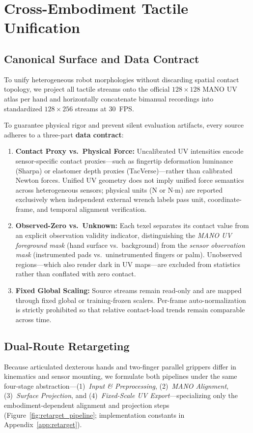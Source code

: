 \section{Cross-Embodiment Tactile Unification}
\label{sec:retarget_data}

\subsection{Canonical Surface and Data Contract}
\label{sec:data_contract}
To unify heterogeneous robot morphologies without discarding spatial contact topology, we project all tactile streams onto the official $128\times 128$ MANO UV atlas \citep{romero2017embodied} per hand and horizontally concatenate bimanual recordings into standardized $128\times 256$ streams at 30~FPS.

To guarantee physical rigor and prevent silent evaluation artifacts, every source adheres to a three-part \textbf{data contract}:
\begin{enumerate}[leftmargin=*,nosep]
    \item \textbf{Contact Proxy vs.\ Physical Force:} Uncalibrated UV intensities encode sensor-specific contact proxies---such as fingertip deformation luminance (Sharpa) or elastomer depth proxies (TacVerse)---rather than calibrated Newton forces. Unified UV geometry does not imply unified force semantics across heterogeneous sensors; physical units (N or N$\cdot$m) are reported exclusively when independent external wrench labels pass unit, coordinate-frame, and temporal alignment verification.
    \item \textbf{Observed-Zero vs.\ Unknown:} Each texel separates its contact value from an explicit observation validity indicator, distinguishing the \emph{MANO UV foreground mask} (hand surface vs.\ background) from the \emph{sensor observation mask} (instrumented pads vs.\ uninstrumented fingers or palm). Unobserved regions---which also render dark in UV maps---are excluded from statistics rather than conflated with zero contact.
    \item \textbf{Fixed Global Scaling:} Source streams remain read-only and are mapped through fixed global or training-frozen scalers. Per-frame auto-normalization is strictly prohibited so that relative contact-load trends remain comparable across time.
\end{enumerate}

\subsection{Dual-Route Retargeting}
\label{sec:retarget_pipelines}
Because articulated dexterous hands and two-finger parallel grippers differ in kinematics and sensor mounting, we formulate both pipelines under the same four-stage abstraction---(1)~\emph{Input \& Preprocessing}, (2)~\emph{MANO Alignment}, (3)~\emph{Surface Projection}, and (4)~\emph{Fixed-Scale UV Export}---specializing only the embodiment-dependent alignment and projection steps (Figure~\ref{fig:retarget_pipeline}; implementation constants in Appendix~\ref{app:retarget}).

